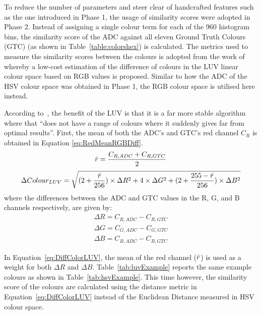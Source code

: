 To reduce the number of parameters and steer clear of handcrafted features such as the one introduced in Phase 1, the usage of similarity scores were adopted in Phase 2.
Instead of assigning a single colour term for each of the 960 histogram bins, the similarity score of the ADC against all eleven Ground Truth Colours (GTC) (as shown in Table~\ref{table:colorshex}) is calculated. The metrics used to measure the similarity scores between the colours is adopted from the work of  whereby a low-cost estimation of the difference of colours in the LUV linear colour space based on RGB values is proposed. Similar to how the ADC of the HSV colour space was obtained in Phase 1, the RGB colour space is utilised here instead. 

According to~, the benefit of the LUV is that it is a far more stable algorithm where that ``does not have a range of colours where it suddenly gives far from optimal results''. First, the mean of both the ADC's and GTC's red channel $C_R$ is obtained in Equation \ref{eq:RedMeanRGBDiff}.
\begin{equation}
\label{eq:RedMeanRGBDiff}
\bar{r} = \frac{C_{R,ADC} + C_{R,GTC}}{2}
\end{equation}
\begin{equation}
\label{eq:DiffColorLUV}
\Delta Colour_{LUV} = \sqrt{(2 + \frac{\bar{r}}{256}) \times \Delta R^{2} + 4 \times \Delta G^{2} + (2 + \frac{255 - \bar{r}}{256}) \times \Delta B^{2} }
\end{equation}
where the differences between the ADC and GTC values in the R, G, and B channels respectively, are given by:
\begin{align}
\Delta R = C_{R,ADC} - C_{R,GTC}\\
\Delta G = C_{G,ADC} - C_{G,GTC}\\
\Delta B = C_{B,ADC} - C_{B,GTC}
 \end{align}
 
In Equation~\ref{eq:DiffColorLUV}, the mean of the red channel ($\bar{r}$) is used as a weight for both $\Delta{R}$ and $\Delta{B}$. Table~\ref{tab:luvExample} reports the same example colours as shown in Table~\ref{tab:hsvExample}. This time however, the similarity score of the colours are calculated using the distance metric in Equation~\ref{eq:DiffColorLUV} instead of the Euclidean Distance measured in HSV colour space.

